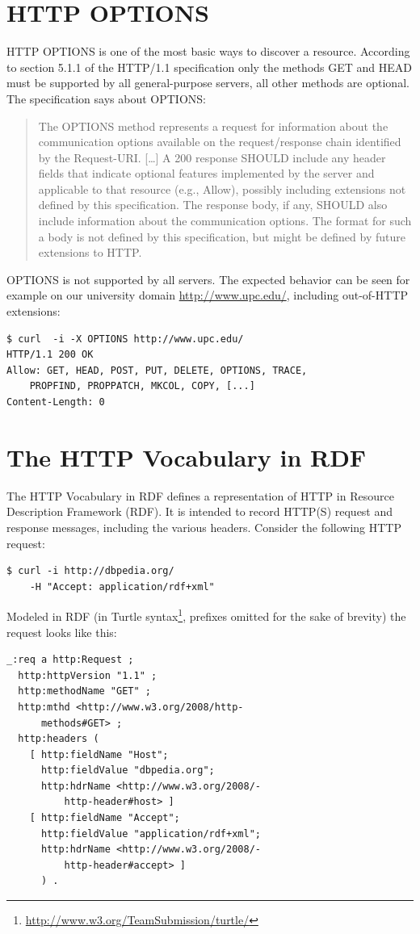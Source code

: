 \documentclass{acm_proc_article-sp}
\begin{document}
\section{HTTP OPTIONS}\label{sec:httpoptions}
HTTP OPTIONS is one of the most basic ways to discover a resource. According to section 5.1.1 of the HTTP/1.1 specification\cite{HTTP:Spec} only the methods GET and HEAD must be supported by all general-purpose servers, all other methods are optional. The specification says about OPTIONS:
\begin{quote}
The OPTIONS method represents a request for information about the communication options available on the request/response chain identified by the Request-URI. [\ldots] A 200 response SHOULD include any header fields that indicate optional features implemented by the server and applicable to that resource (e.g., Allow), possibly including extensions not defined by this specification. The response body, if any, SHOULD also include information about the communication options. The format for such a body is not defined by this specification, but might be defined by future extensions to HTTP.
\end{quote}
OPTIONS is not supported by all servers. The expected behavior can be seen for example on our university domain \url{http://www.upc.edu/}, including out-of-HTTP extensions:
\begin{lstlisting}
$ curl  -i -X OPTIONS http://www.upc.edu/
HTTP/1.1 200 OK
Allow: GET, HEAD, POST, PUT, DELETE, OPTIONS, TRACE,
    PROPFIND, PROPPATCH, MKCOL, COPY, [...]
Content-Length: 0
\end{lstlisting}

\section{The HTTP Vocabulary in RDF}\label{sec:httpvocab}
The HTTP Vocabulary in RDF\cite{HTTP:RDF} defines a representation of HTTP in Resource Description Framework (RDF)\cite{W3C:RDF}. It is intended to record HTTP(S) request and response messages, including the various headers. Consider the following HTTP request:
\begin{lstlisting}
$ curl -i http://dbpedia.org/
    -H "Accept: application/rdf+xml"
\end{lstlisting}
Modeled in RDF (in Turtle syntax\footnote{\url{http://www.w3.org/TeamSubmission/turtle/}}, prefixes omitted for the sake of brevity) the request looks like this:
\begin{lstlisting}
_:req a http:Request ;
  http:httpVersion "1.1" ;
  http:methodName "GET" ;
  http:mthd <http://www.w3.org/2008/http-
      methods#GET> ;
  http:headers (
    [ http:fieldName "Host";
      http:fieldValue "dbpedia.org";
      http:hdrName <http://www.w3.org/2008/-
          http-header#host> ]
    [ http:fieldName "Accept";
      http:fieldValue "application/rdf+xml";
      http:hdrName <http://www.w3.org/2008/-
          http-header#accept> ]
      ) .
\end{lstlisting}
\end{document}
